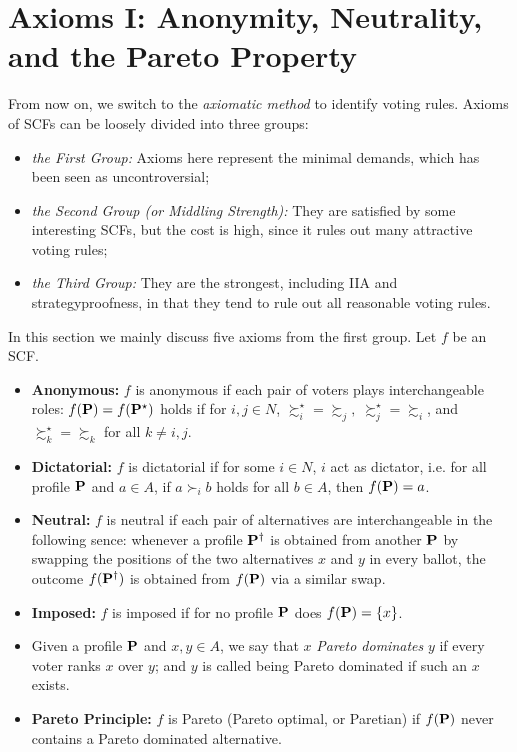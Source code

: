 \section{Axioms I: Anonymity, Neutrality, and the Pareto Property}

From now on, we switch to the \textit{axiomatic method} to identify voting rules. Axioms of SCFs can be loosely divided into three groups:
\begin{itemize}
    \item \textit{the First Group:} Axioms here represent the minimal demands, which has been seen as uncontroversial;
    \item \textit{the Second Group (or Middling Strength):} They are satisfied by some interesting SCFs, but the cost is high, since it rules out many attractive voting rules;
    \item \textit{the Third Group:} They are the strongest, including IIA and strategyproofness, in that they tend to rule out all reasonable voting rules.
\end{itemize}

In this section we mainly discuss five axioms from the first group. Let $f$ be an SCF.

\begin{definition}
    \begin{itemize}
        \item \textbf{Anonymous:} $f$ is anonymous if each pair of voters plays interchangeable roles: $f(\mathbf{P}) = f(\mathbf{P}^\star)$ holds if for $i, j \in N$, $\succsim^\star_i = \succsim_j,\; \succsim^\star_j = \succsim_i$, and $\succsim^\star_k = \succsim_k$ for all $k \neq i,j$.
        \item \textbf{Dictatorial:} $f$ is dictatorial if for some $i \in N$, $i$ act as dictator, i.e. for all profile $\mathbf{P}$ and $a \in A$, if $a \succ_i b$ holds for all $b \in A$, then $f(\mathbf{P}) = a$.
        \item \textbf{Neutral: } $f$ is neutral if each pair of alternatives are interchangeable in the following sence: whenever a profile $\mathbf{P}^\dagger$ is obtained from another $\mathbf{P}$ by swapping the positions of the two alternatives $x$ and $y$ in every ballot, the outcome $f(\mathbf{P}^\dagger)$ is obtained from $f(\mathbf{P})$ via a similar swap.
        \item \textbf{Imposed:} $f$ is imposed if for no profile $\mathbf{P}$ does $f(\mathbf{P}) = \{x\}$.
        \item Given a profile $\mathbf{P}$ and $x,y \in A$, we say that $x$ \textit{Pareto dominates} $y$ if every voter ranks $x$ over $y$; and $y$ is called being Pareto dominated if such an $x$ exists.
        \item \textbf{Pareto Principle:} $f$ is Pareto (Pareto optimal, or Paretian) if $f(\mathbf{P})$ never contains a Pareto dominated alternative.
    \end{itemize}
\end{definition}

